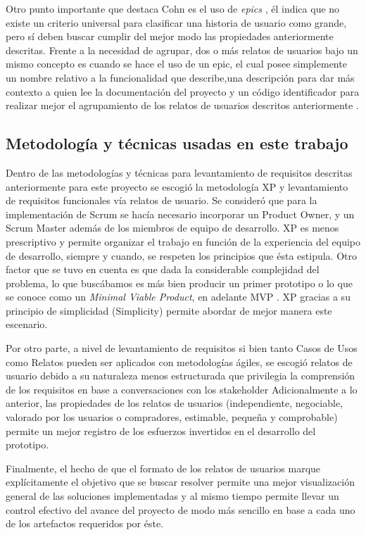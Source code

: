 Otro punto importante que destaca Cohn es el uso de \textit{epics} , él indica que no existe un criterio universal para clasificar una historia de usuario como grande, pero sí deben buscar cumplir del mejor modo las propiedades anteriormente descritas. Frente a la necesidad de agrupar, dos o más relatos de usuarios bajo un mismo concepto es cuando se hace el uso de un epic, el cual posee simplemente un nombre relativo a la funcionalidad que describe,una descripción para dar más contexto a quien lee la documentación del proyecto y un código identificador para realizar mejor el agrupamiento de los relatos de usuarios descritos anteriormente \cite{user_stories_applied}.

\subsection{Metodología y técnicas usadas en este trabajo \label{sec:work_decisions}}

Dentro de las metodologías y técnicas para levantamiento de requisitos descritas anteriormente para este proyecto se escogió la metodología XP y levantamiento de requisitos funcionales vía relatos de usuario. Se consideró que para la implementación de Scrum se hacía necesario incorporar un Product Owner, y un Scrum Master además de los miembros de equipo de desarrollo. XP es menos prescriptivo y permite organizar el  trabajo en función de la experiencia del equipo de desarrollo, siempre y cuando, se respeten los principios que ésta estipula.  Otro factor  que se tuvo en cuenta es que dada la considerable complejidad del problema, lo que buscábamos es más bien producir un primer prototipo o lo que se conoce como un \textit{Minimal Viable Product}, en adelante MVP . XP gracias a su principio  de simplicidad (Simplicity) permite abordar de mejor manera este escenario.

Por otro parte, a nivel de levantamiento de requisitos si bien tanto Casos de Usos como Relatos pueden ser aplicados con metodologías ágiles, se escogió relatos de usuario debido a su naturaleza menos estructurada que privilegia la comprensión de los requisitos en base a conversaciones con los  stakeholder Adicionalmente a lo anterior, las propiedades de los relatos de usuarios (independiente, negociable, valorado por los usuarios o compradores, estimable, pequeña y comprobable) permite un mejor registro de los esfuerzos invertidos en el desarrollo del prototipo.

Finalmente, el hecho de que el formato de los relatos de usuarios marque explícitamente el objetivo que se buscar resolver permite una mejor visualización general de las soluciones implementadas y al mismo tiempo permite llevar un control efectivo del avance del proyecto de modo más sencillo en base a cada uno de los artefactos requeridos por éste.

